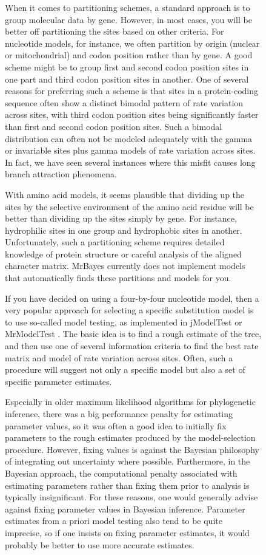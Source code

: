 \documentclass[12pt]{book}
\begin{document}
\begin{figure}[h]
When it comes to partitioning schemes, a standard approach is to group molecular data by gene.
However, in most cases, you will be better off partitioning the sites based on other criteria. For
nucleotide models, for instance, we often partition by origin (nuclear or mitochondrial) and codon
position rather than by gene. A good scheme might be to group first and second codon position sites
in one part and third codon position sites in another. One of several reasons for preferring such a
scheme is that sites in a protein-coding sequence often show a distinct bimodal pattern of rate
variation across sites, with third codon position sites being significantly faster than first and
second codon position sites. Such a bimodal distribution can often not be modeled adequately with
the gamma or invariable sites plus gamma models of rate variation across sites. In fact, we have
seen several instances where this misfit causes long branch attraction phenomena.

With amino acid models, it seems plausible that dividing up the sites by the selective environment
of the amino acid residue will be better than dividing up the sites simply by gene. For instance,
hydrophilic sites in one group and hydrophobic sites in another. Unfortunately, such a partitioning
scheme requires detailed knowledge of protein structure or careful analysis of the aligned
character matrix. MrBayes currently does not implement models that automatically finds these
partitions and models for you.

If you have decided on using a four-by-four nucleotide model, then a very popular approach for
selecting a specific substitution model is to use so-called model testing, as implemented in
jModelTest \citep{posada08} or MrModelTest \citep{nylander04b}. The basic idea is to find a rough
estimate of the tree, and then use one of several information criteria to find the best rate matrix
and model of rate variation across sites. Often, such a procedure will suggest not only a specific
model but also a set of specific parameter estimates.

Especially in older maximum likelihood algorithms for phylogenetic inference, there was a big
performance penalty for estimating parameter values, so it was often a good idea to initially fix
parameters to the rough estimates produced by the model-selection procedure. However, fixing values
is against the Bayesian philosophy of integrating out uncertainty where possible. Furthermore, in
the Bayesian approach, the computational penalty associated with estimating parameters rather than
fixing them prior to analysis is typically insignificant. For these reasons, one would generally
advise against fixing parameter values in Bayesian inference. Parameter estimates from a priori
model testing also tend to be quite imprecise, so if one insists on fixing parameter estimates, it
would probably be better to use more accurate estimates.


\end{figure}
\end{document}
